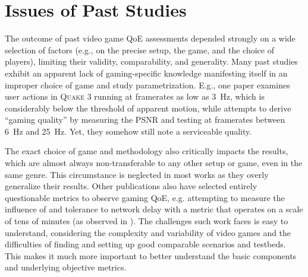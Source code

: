 \section{Issues of Past Studies}
\label{sec:relatedwork}

The outcome of past video game \gls{QoE} assessments depended strongly on a wide selection of factors (e.g., on the precise setup, the game, and the choice of players), limiting their validity, comparability, and generality. Many past studies exhibit an apparent lack of gaming-specific knowledge manifesting itself in an improper choice of game and study parametrization. E.g., one paper \cite{claypool2007} examines user actions in \textsc{Quake 3} running at framerates as low as \SI{3}{\hertz}, which is considerably below the threshold of apparent motion, while \cite{5506572} attempts to derive ``gaming quality'' by measuring the \acrshort{PSNR} and testing at framerates between \SI{6}{\hertz} and \SI{25}{\hertz}. Yet, they somehow still note a serviceable quality.


The exact choice of game and methodology also critically impacts the results, which are almost always non-transferable to any other setup or game, even in the same genre. This circumstance is neglected in most works as they overly generalize their results. 
Other publications also have selected entirely questionable metrics to observe gaming \gls{QoE}, e.g. attempting to measure the influence of and tolerance to network delay with a metric that operates on a scale of tens of minutes (as observed in \cite{Claypool:2006:LPA:1167838.1167860}). The challenges such work faces is easy to understand, considering the complexity and variability of video games and the difficulties of finding and setting up good comparable scenarios and testbeds. This makes it much more important to better understand the basic components and underlying objective metrics.




